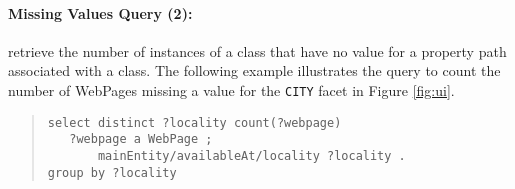 \paragraph{Missing Values Query (2):} retrieve the number of instances of a class that have no value for a property path associated with a class.
The following example illustrates the query to count the number of WebPages missing a value for the \verb|CITY| facet in Figure \ref{fig:ui}.
\begin{quote}
{\footnotesize
\begin{verbatim}
select distinct ?locality count(?webpage)
   ?webpage a WebPage ;
       mainEntity/availableAt/locality ?locality .
group by ?locality
\end{verbatim}}
\end{quote}